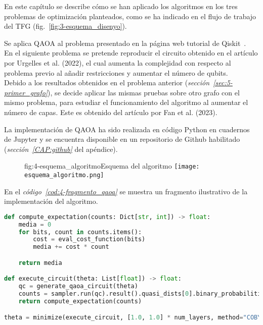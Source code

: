 
En este capítulo se describe cómo se han aplicado los algoritmos en los tres problemas de optimización planteados, como se ha indicado en el flujo de trabajo del TFG (fig.~\ref{fig:3-esquema_disenyo}).

Se aplica QAOA al problema presentado en la página web tutorial de Qiskit~\cite{qiskit_tutorial_antiguo}.
\\
En el siguiente problema se pretende reproducir el circuito obtenido en el artículo por Urgelles et al. (2022)\cite{multi-objective_routing_optimization}, el cual aumenta la complejidad con respecto al problema previo al añadir restricciones y aumentar el número de qubits.
\\
Debido a los resultados obtenidos en el problema anterior (\textit{sección~\ref{sec:5-primer_grafo}}), se decide aplicar las mismas pruebas sobre otro grafo con el mismo problema, para estudiar el funcionamiento del algoritmo al aumentar el número de capas.
Este es obtenido del artículo por Fan et al. (2023)\cite{solving_shortest_path_with_qaoa}.

La implementación de QAOA ha sido realizada en código Python en cuadernos de Jupyter y se encuentra disponible en un repositorio de Github habilitado (\textit{sección~\ref{CAP:github}} del apéndice).

\begin{figure}[Esquema del algoritmo]{fig:4-esquema_algoritmo}{Esquema del algoritmo}
  \centering
  \texttt{[image: esquema\_algoritmo.png]}
\end{figure}

En el \textit{código~\ref{cod:4-fragmento_qaoa}} se muestra un fragmento ilustrativo de la implementación del algoritmo.

\newpage

\begin{lstlisting}[language=Python,label=cod:4-fragmento_qaoa,caption={Fragmento de código de una ejecución de QAOA.},style=numbered]
def compute_expectation(counts: Dict[str, int]) -> float:
    media = 0
    for bits, count in counts.items():
        cost = eval_cost_function(bits)
        media += cost * count

    return media

def execute_circuit(theta: List[float]) -> float:
    qc = generate_qaoa_circuit(theta)
    counts = sampler.run(qc).result().quasi_dists[0].binary_probabilities()
    return compute_expectation(counts)

theta = minimize(execute_circuit, [1.0, 1.0] * num_layers, method="COBYLA")
\end{lstlisting}

